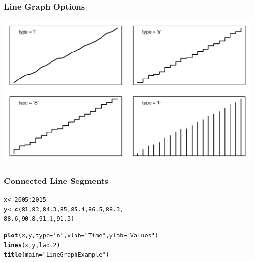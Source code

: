 \documentclass[12pt]{beamer}\usepackage[]{graphicx}\usepackage[]{color}
\makeatletter
\newcommand{\hlnum}[1]{\textcolor[rgb]{0.686,0.059,0.569}{#1}}%
\newcommand{\hlstr}[1]{\textcolor[rgb]{0.192,0.494,0.8}{#1}}%
\newcommand{\hlopt}[1]{\textcolor[rgb]{0,0,0}{#1}}%
\newcommand{\hlstd}[1]{\textcolor[rgb]{0.345,0.345,0.345}{#1}}%
\newcommand{\hlkwb}[1]{\textcolor[rgb]{0.69,0.353,0.396}{#1}}%
\newcommand{\hlkwc}[1]{\textcolor[rgb]{0.333,0.667,0.333}{#1}}%
\newcommand{\hlkwd}[1]{\textcolor[rgb]{0.737,0.353,0.396}{\textbf{#1}}}%
\newenvironment{kframe}{%
 \def\at@end@of@kframe{}%
 \ifinner\ifhmode%
  \def\at@end@of@kframe{\end{minipage}}%
  \begin{minipage}{\columnwidth}%
 \fi\fi%
 \def\FrameCommand##1{\hskip\@totalleftmargin \hskip-\fboxsep
 \colorbox{shadecolor}{##1}\hskip-\fboxsep
     \hskip-\linewidth \hskip-\@totalleftmargin \hskip\columnwidth}%
 \MakeFramed {\advance\hsize-\width
   \@totalleftmargin\z@ \linewidth\hsize
   \@setminipage}}%
 {\par\unskip\endMakeFramed%
 \at@end@of@kframe}
\newenvironment{knitrout}{}{} %
\makeatother
\begin{document}

\begin{frame}[fragile]
\frametitle{Line Graph Options}
\begin{knitrout}\scriptsize
{}\color{fgcolor}

{\centering \includegraphics[width=.9\linewidth,height=.6\linewidth]{figure/line_types-1} 

}



\end{knitrout}
\end{frame}


\begin{frame}[fragile]
\frametitle{Connected Line Segments}
\begin{knitrout}\footnotesize
{}\color{fgcolor}\begin{kframe}
\begin{alltt}
\hlstd{x} \hlkwb{<-} \hlnum{2005}\hlopt{:}\hlnum{2015}
\hlstd{y} \hlkwb{<-} \hlkwd{c}\hlstd{(}\hlnum{81}\hlstd{,} \hlnum{83}\hlstd{,} \hlnum{84.3}\hlstd{,} \hlnum{85}\hlstd{,} \hlnum{85.4}\hlstd{,} \hlnum{86.5}\hlstd{,} \hlnum{88.3}\hlstd{,}
       \hlnum{88.6}\hlstd{,} \hlnum{90.8}\hlstd{,} \hlnum{91.1}\hlstd{,} \hlnum{91.3}\hlstd{)}

\hlkwd{plot}\hlstd{(x, y,} \hlkwc{type} \hlstd{=} \hlstr{'n'}\hlstd{,} \hlkwc{xlab} \hlstd{=} \hlstr{"Time"}\hlstd{,} \hlkwc{ylab} \hlstd{=} \hlstr{"Values"}\hlstd{)}
\hlkwd{lines}\hlstd{(x, y,} \hlkwc{lwd} \hlstd{=} \hlnum{2}\hlstd{)}
\hlkwd{title}\hlstd{(}\hlkwc{main} \hlstd{=} \hlstr{"Line Graph Example"}\hlstd{)}
\end{alltt}
\end{kframe}
\end{knitrout}
\end{frame}
\end{document}
